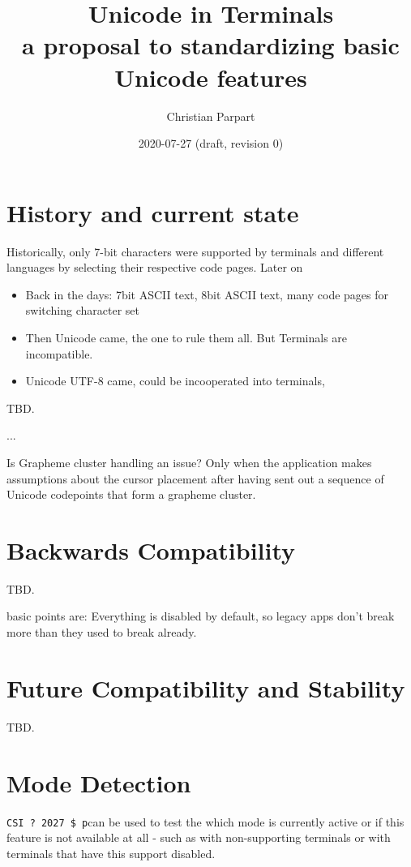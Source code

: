 \documentclass{article}
\title{Unicode in Terminals \\
a proposal to standardizing basic Unicode features}
\author{Christian Parpart}
\date{2020-07-27 (draft, revision 0)}
\newcommand{\code}[1]{\colorbox{light-gray}{\texttt{#1}}}
\newcommand{\DECRQM}[1]{\code{CSI ? #1 \$ p}}
\newcommand\VtModeNum{2027}                          %
\newcommand{\GCTEST}{\DECRQM{\VtModeNum{}}} %
\begin{document}
\maketitle

\tableofcontents

\section{History and current state}

Historically, only 7-bit characters were supported by terminals and different languages by selecting
their respective code pages.
Later on

\begin{itemize}
    \item Back in the days: 7bit ASCII text, 8bit ASCII text, many code pages for switching character set
    \item Then Unicode came, the one to rule them all. But Terminals are incompatible.
    \item Unicode UTF-8 came, could be incooperated into terminals,
\end{itemize}

TBD.

...

Is Grapheme cluster handling an issue? Only when the application makes assumptions about
the cursor placement after having sent out a sequence of Unicode codepoints that form a grapheme
cluster.

\section{Backwards Compatibility}

TBD.

basic points are:
Everything is disabled by default, so legacy apps don't break more than they
used to break already.

\section{Future Compatibility and Stability}

TBD.

\section{Mode Detection}

\GCTEST can be used to test the which mode is currently active or if this feature is not available
at all - such as with non-supporting terminals or with terminals that have this support disabled.
\end{document}
